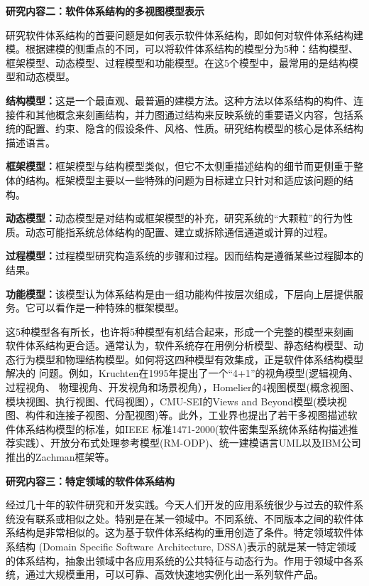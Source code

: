 \documentclass[article]{BJTU-thesis}
\begin{document}
	\noindent\textbf{研究内容二：软件体系结构的多视图模型表示}
	
	  研究软件体系结构的首要问题是如何表示软件体系结构，即如何对软件体系结构建模。根据建模的侧重点的不同，可以将软件体系结构的模型分为5种：结构模型、框架模型、动态模型、过程模型和功能模型。在这5个模型中，最常用的是结构模型和动态模型。
	  
	\textbf{结构模型：}这是一个最直观、最普遍的建模方法。这种方法以体系结构的构件、连接件和其他概念来刻画结构，并力图通过结构来反映系统的重要语义内容，包括系统的配置、约束、隐含的假设条件、风格、性质。研究结构模型的核心是体系结构描述语言。

	\textbf{框架模型：}框架模型与结构模型类似，但它不太侧重描述结构的细节而更侧重于整体的结构。框架模型主要以一些特殊的问题为目标建立只针对和适应该问题的结构。

	\textbf{动态模型：}动态模型是对结构或框架模型的补充，研究系统的“大颗粒”的行为性 质。动态可能指系统总体结构的配置、建立或拆除通信通道或计算的过程。
	
	\textbf{过程模型：}过程模型研究构造系统的步骤和过程。因而结构是遵循某些过程脚本的结果。
	
	\textbf{功能模型：}该模型认为体系结构是由一组功能构件按层次组成，下层向上层提供服务。它可以看作是一种特殊的框架模型。
	
	这5种模型各有所长，也许将5种模型有机结合起来，形成一个完整的模型来刻画 软件体系结构更合适。通常认为，软件系统存在用例分析模型、静态结构模型、动态行为模型和物理结构模型\cite{Schmuller2004Sams}。如何将这四种模型有效集成，正是软件体系结构模型解决的 问题。例如，Kruchten在1995年提出了一个“4+1”的视角模型(逻辑视角、过程视角、 物理视角、开发视角和场景视角），Homelier的4视图模型(概念视图、模块视图、执行视图、代码视图），CMU-SEI的Views and Beyond模型(模块视图、构件和连接子视图、分配视图)等。此外，工业界也提出了若干多视图描述软件体系结构模型的标准，如IEEE 标准1471-2000(软件密集型系统体系结构描述推荐实践）、开放分布式处理参考模型(RM-ODP)、统一建模语言UML以及IBM公司推出的Zachman框架等。
	\newline
	
	\noindent\textbf{研究内容三：特定领域的软件体系结构}
	
	 经过几十年的软件研究和开发实践。今天人们开发的应用系统很少与过去的软件系统没有联系或相似之处。特别是在某一领域中。不同系统、不同版本之间的软件体系结构是非常相似的。这为基于软件体系结构的重用创造了条件。特定领域软件体系结构 (Domain Specific Software Architecture, DSSA)表示的就是某一特定领域的体系结构，抽象出领域中各应用系统的公共特征与动态行为。作用于领域中各系统，通过大规模重用，可以可靠、高效快速地实例化出一系列软件产品。
	 
\end{document}

